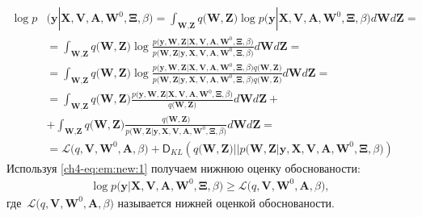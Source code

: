 \[
\label{ch4-eq:em:new:1}
\begin{aligned}
\log p&\bigr(\mathbf{y}|\mathbf{X}, \mathbf{V}, \textbf{A}, \textbf{W}^{0}, \bm{\Xi}, \beta\bigr) = \int_{\textbf{W}, \textbf{Z}} q\bigr(\textbf{W}, \textbf{Z}\bigr) \log p\bigr(\mathbf{y}|\mathbf{X}, \mathbf{V}, \textbf{A}, \textbf{W}^{0}, \bm{\Xi}, \beta\bigr)d\textbf{W}d\textbf{Z} =\\
&= \int_{\textbf{W}, \textbf{Z}} q\bigr(\textbf{W}, \textbf{Z}\bigr)\log \frac{p\bigr(\mathbf{y}, \textbf{W}, \textbf{Z}|\mathbf{X}, \mathbf{V}, \textbf{A}, \textbf{W}^{0}, \bm{\Xi}, \beta\bigr)}{p\bigr(\textbf{W}, \textbf{Z}|\mathbf{y}, \mathbf{X}, \mathbf{V}, \textbf{A}, \textbf{W}^{0}, \bm{\Xi}, \beta\bigr)}d\textbf{W}d\textbf{Z}=\\
&= \int_{\textbf{W}, \textbf{Z}} q\bigr(\textbf{W}, \textbf{Z}\bigr)\log \frac{p\bigr(\mathbf{y}, \textbf{W}, \textbf{Z}|\mathbf{X}, \mathbf{V}, \textbf{A}, \textbf{W}^{0}, \bm{\Xi}, \beta\bigr)q\bigr(\textbf{W}, \textbf{Z}\bigr)}{p\bigr(\textbf{W}, \textbf{Z}|\mathbf{y}, \mathbf{X}, \mathbf{V}, \textbf{A}, \textbf{W}^{0}, \bm{\Xi}, \beta\bigr)q\bigr(\textbf{W}, \textbf{Z}\bigr)}d\textbf{W}d\textbf{Z}=\\
&= \int_{\textbf{W}, \textbf{Z}} q\bigr(\textbf{W}, \textbf{Z}\bigr)\frac{p\bigr(\mathbf{y}, \textbf{W}, \textbf{Z}|\mathbf{X}, \mathbf{V}, \textbf{A}, \textbf{W}^{0}, \bm{\Xi}, \beta\bigr)}{q\bigr(\textbf{W}, \textbf{Z}\bigr)}d\textbf{W}d\textbf{Z}+\\
&+\int_{\textbf{W}, \textbf{Z}} q\bigr(\textbf{W}, \textbf{Z}\bigr)\frac{q\bigr(\textbf{W}, \textbf{Z}\bigr)}{p\bigr(\textbf{W}, \textbf{Z}|\mathbf{y}, \mathbf{X}, \mathbf{V}, \textbf{A}, \textbf{W}^{0}, \bm{\Xi}, \beta\bigr)}d\textbf{W}d\textbf{Z}=\\
&=\mathcal{L}\bigr(q, \textbf{V}, \textbf{W}^{0}, \textbf{A}, \beta\bigr)+\mathsf{D}_{KL}\left(q\bigr(\textbf{W}, \textbf{Z}\bigr)||p\bigr(\textbf{W}, \textbf{Z}|\mathbf{y}, \mathbf{X}, \mathbf{V}, \textbf{A}, \textbf{W}^{0}, \bm{\Xi}, \beta\bigr)\right)
\end{aligned}
\]
Используя \eqref{ch4-eq:em:new:1} получаем нижнюю оценку обоснованости:
\[
\label{ch4-eq:em:new:2}
\begin{aligned}
\log p\bigr(\mathbf{y}|\mathbf{X}, \mathbf{V}, \textbf{A}, \textbf{W}^{0}, \bm{\Xi}, \beta\bigr)\geq \mathcal{L}\bigr(q, \textbf{V}, \textbf{W}^{0}, \textbf{A}, \beta\bigr),
\end{aligned}
\]
где~$\mathcal{L}\bigr(q, \textbf{V}, \textbf{W}^{0}, \textbf{A}, \beta\bigr)$ называется нижней оценкой обоснованости.

